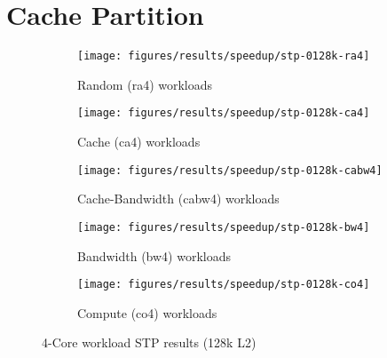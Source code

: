 
\section{Cache Partition}
\label{sec:results:cache_partition}

\begin{figure}
    \centering
    \begin{subfigure}[b]{\textwidth}
            \texttt{[image: figures/results/speedup/stp-0128k-ra4]}
            \caption{Random (ra4) workloads}
            \label{fig:results:4core:stp:random}
    \end{subfigure}

    \begin{subfigure}[b]{0.5\textwidth}
            \texttt{[image: figures/results/speedup/stp-0128k-ca4]}
            \caption{Cache (ca4) workloads}
            \label{fig:results:4core:stp:cache}
    \end{subfigure}%
    \begin{subfigure}[b]{0.5\textwidth}
            \texttt{[image: figures/results/speedup/stp-0128k-cabw4]}
            \caption{Cache-Bandwidth (cabw4) workloads}
            \label{fig:results:4core:stp:cache-bw}
    \end{subfigure}

    \begin{subfigure}[b]{0.5\textwidth}
            \texttt{[image: figures/results/speedup/stp-0128k-bw4]}
            \caption{Bandwidth (bw4) workloads}
            \label{fig:results:4core:stp:bw}
    \end{subfigure}%
    \begin{subfigure}[b]{0.5\textwidth}
            \texttt{[image: figures/results/speedup/stp-0128k-co4]}
            \caption{Compute (co4) workloads}
            \label{fig:results:4core:stp:co}
    \end{subfigure}%

    \caption{4-Core workload STP results (128k L2)}\label{fig:results:4core:stp}
\end{figure}

